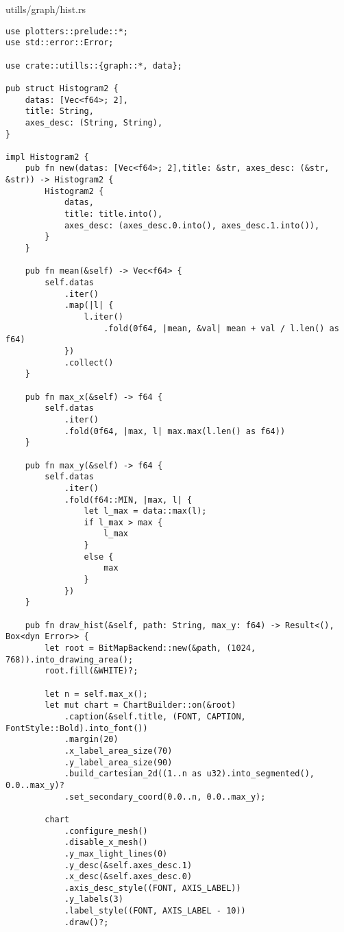 \begin{code}
\caption{utills/graph/hist.rs}
\begin{verbatim}  
use plotters::prelude::*;
use std::error::Error;

use crate::utills::{graph::*, data};

pub struct Histogram2 {
    datas: [Vec<f64>; 2],
    title: String,
    axes_desc: (String, String),
}

impl Histogram2 {
    pub fn new(datas: [Vec<f64>; 2],title: &str, axes_desc: (&str, &str)) -> Histogram2 {
        Histogram2 {
            datas,
            title: title.into(),
            axes_desc: (axes_desc.0.into(), axes_desc.1.into()),
        }
    }

    pub fn mean(&self) -> Vec<f64> {
        self.datas
            .iter()
            .map(|l| {
                l.iter()
                    .fold(0f64, |mean, &val| mean + val / l.len() as f64)
            })
            .collect()
    }

    pub fn max_x(&self) -> f64 {
        self.datas
            .iter()
            .fold(0f64, |max, l| max.max(l.len() as f64))
    }

    pub fn max_y(&self) -> f64 {
        self.datas
            .iter()
            .fold(f64::MIN, |max, l| {
                let l_max = data::max(l);
                if l_max > max {
                    l_max
                }
                else {
                    max
                }
            })
    }

    pub fn draw_hist(&self, path: String, max_y: f64) -> Result<(), Box<dyn Error>> {
        let root = BitMapBackend::new(&path, (1024, 768)).into_drawing_area();
        root.fill(&WHITE)?;

        let n = self.max_x();
        let mut chart = ChartBuilder::on(&root)
            .caption(&self.title, (FONT, CAPTION, FontStyle::Bold).into_font())
            .margin(20)
            .x_label_area_size(70)
            .y_label_area_size(90)
            .build_cartesian_2d((1..n as u32).into_segmented(), 0.0..max_y)?
            .set_secondary_coord(0.0..n, 0.0..max_y);

        chart
            .configure_mesh()
            .disable_x_mesh()
            .y_max_light_lines(0)
            .y_desc(&self.axes_desc.1)
            .x_desc(&self.axes_desc.0)
            .axis_desc_style((FONT, AXIS_LABEL))
            .y_labels(3)
            .label_style((FONT, AXIS_LABEL - 10))
            .draw()?;



\end{verbatim}
\end{code}
